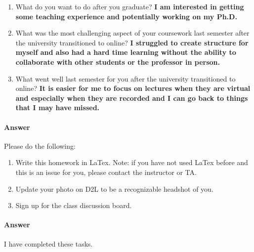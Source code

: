 \documentclass{article}
\begin{document}
\begin{enumerate}
    \item What do you want to do after you graduate?
    \newline \textbf{I am interested in getting some teaching experience and potentially working on my Ph.D.}
    \item What was the most challenging aspect of your coursework last semester
        after the university transitioned to online?
        \newline \textbf{I struggled to create structure for myself and also had a hard time learning without the ability to collaborate with other students or the professor in person. }
    \item What went well last semester for you after the university transitioned
        to online?
        \newline \textbf{It is easier for me to focus on lectures when they are virtual and especially when they are recorded and I can go back to things that I may have missed. }
\end{enumerate}

\paragraph{Answer}



\nextprob
{}

Please do the following:
\begin{enumerate}
    \item Write this homework in LaTex.
        Note: if you have not used LaTex before and this is an
        issue for you, please contact the instructor or TA.
    \item Update your photo on D2L to be a recognizable headshot of you.
    \item Sign up for the class discussion board.
\end{enumerate}

\paragraph{Answer}


I have completed these tasks. 

\end{document}
